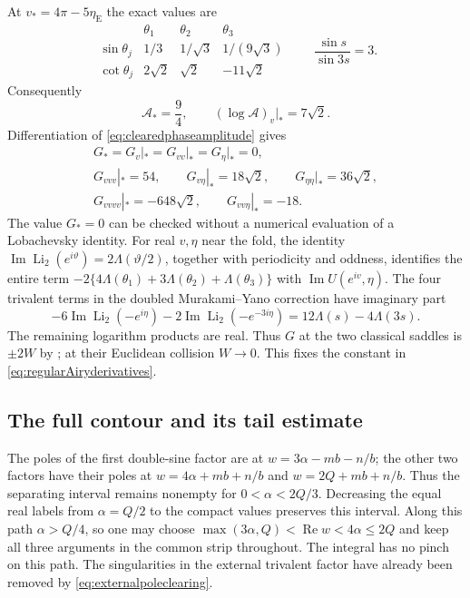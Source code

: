 At $v_*=4\pi-5\eta_{\mathrm E}$ the exact values are
\[
 \begin{array}{c|ccc}
 &\theta_1&\theta_2&\theta_3\\ \hline
 \sin\theta_j&1/3&1/\sqrt3&1/(9\sqrt3)\\
 \cot\theta_j&2\sqrt2&\sqrt2&-11\sqrt2
 \end{array}
 \qquad
 \frac{\sin s}{\sin3s}=3.
\]
Consequently
\begin{equation}
 \mathcal A_*=\frac94,\qquad
 (\log\mathcal A)_v\big|_*=7\sqrt2.
 \label{eq:regularAiryamplitude}
\end{equation}
Differentiation of \eqref{eq:clearedphaseamplitude} gives
\begin{equation}
 \begin{gathered}
 G_*=G_v|_*=G_{vv}|_*=G_\eta|_*=0,\\
 G_{vvv}|_*=54,\qquad G_{v\eta}|_*=18\sqrt2,\qquad
 G_{\eta\eta}|_*=36\sqrt2,\\
 G_{vvvv}|_*=-648\sqrt2,\qquad G_{vv\eta}|_*=-18.
 \end{gathered}
 \label{eq:regularAiryderivatives}
\end{equation}
The value $G_*=0$ can be checked without a numerical evaluation
of a Lobachevsky identity. For real $v,\eta$ near the fold,
the identity
$\operatorname{Im}\operatorname{Li}_2(e^{i\vartheta})
=2\Lambda(\vartheta/2)$, together with periodicity and
oddness, identifies the entire term
$-2\{4\Lambda(\theta_1)+3\Lambda(\theta_2)+\Lambda(\theta_3)\}$ with
$\operatorname{Im}U(e^{iv},\eta)$. The four trivalent terms
in the doubled Murakami--Yano correction have imaginary part
\[
 -6\operatorname{Im}\operatorname{Li}_2(-e^{i\eta})
 -2\operatorname{Im}\operatorname{Li}_2(-e^{-3i\eta})
 =12\Lambda(s)-4\Lambda(3s).
\]
The remaining logarithm products are real. Thus $G$ at the
two classical saddles is $\pm2W$ by
\cite[Theorem~2]{MurakamiYano}; at their Euclidean collision
$W\to0$. This fixes the constant in
\eqref{eq:regularAiryderivatives}.

\subsection{The full contour and its tail estimate}

The poles of the first double-sine factor are at
$w=3\alpha-mb-n/b$; the other two factors have their poles
at $w=4\alpha+mb+n/b$ and $w=2Q+mb+n/b$.
Thus the separating interval remains nonempty for
$0<\alpha<2Q/3$. Decreasing the equal real labels from
$\alpha=Q/2$ to the compact values preserves this interval.
Along this path $\alpha>Q/4$, so one may choose
$\max(3\alpha,Q)<\operatorname{Re}w<4\alpha\le2Q$ and keep
all three arguments in the common strip throughout.
The integral has no pinch on this path. The singularities
in the external trivalent factor have already been removed
by \eqref{eq:externalpoleclearing}.

